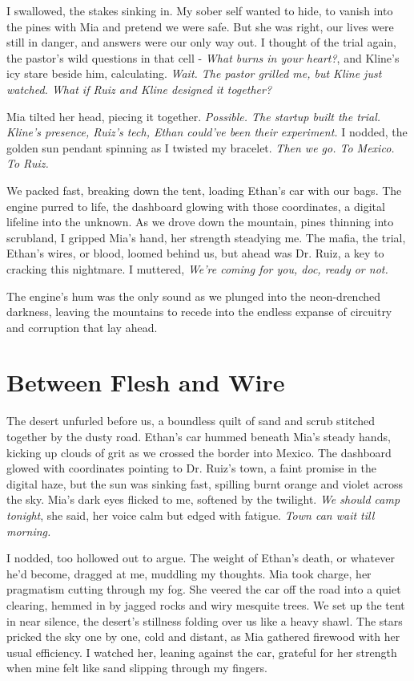 \documentclass[12pt,oneside]{book}
\begin{document}
I swallowed, the stakes sinking in. My sober self wanted to hide, to vanish into the pines with Mia and pretend we were safe. But she was right, our lives were still in danger, and answers were our only way out. I thought of the trial again, the pastor’s wild questions in that cell - \textit{What burns in your heart?}, and Kline’s icy stare beside him, calculating. \textit{Wait. The pastor grilled me, but Kline just watched. What if Ruiz and Kline designed it together?}

Mia tilted her head, piecing it together. \textit{Possible. The startup built the trial. Kline’s presence, Ruiz’s tech, Ethan could’ve been their experiment.} I nodded, the golden sun pendant spinning as I twisted my bracelet. \textit{Then we go. To Mexico. To Ruiz.}

We packed fast, breaking down the tent, loading Ethan’s car with our bags. The engine purred to life, the dashboard glowing with those coordinates, a digital lifeline into the unknown. As we drove down the mountain, pines thinning into scrubland, I gripped Mia’s hand, her strength steadying me. The mafia, the trial, Ethan’s wires, or blood, loomed behind us, but ahead was Dr. Ruiz, a key to cracking this nightmare. I muttered, \textit{We’re coming for you, doc, ready or not.}

The engine's hum was the only sound as we plunged into the neon-drenched darkness, leaving the mountains to recede into the endless expanse of circuitry and corruption that lay ahead.

\chapter{Between Flesh and Wire}

The desert unfurled before us, a boundless quilt of sand and scrub stitched together by the dusty road. Ethan's car hummed beneath Mia’s steady hands, kicking up clouds of grit as we crossed the border into Mexico. The dashboard glowed with coordinates pointing to Dr. Ruiz’s town, a faint promise in the digital haze, but the sun was sinking fast, spilling burnt orange and violet across the sky. Mia’s dark eyes flicked to me, softened by the twilight. \textit{We should camp tonight}, she said, her voice calm but edged with fatigue. \textit{Town can wait till morning.}

I nodded, too hollowed out to argue. The weight of Ethan’s death, or whatever he’d become, dragged at me, muddling my thoughts. Mia took charge, her pragmatism cutting through my fog. She veered the car off the road into a quiet clearing, hemmed in by jagged rocks and wiry mesquite trees. We set up the tent in near silence, the desert’s stillness folding over us like a heavy shawl. The stars pricked the sky one by one, cold and distant, as Mia gathered firewood with her usual efficiency. I watched her, leaning against the car, grateful for her strength when mine felt like sand slipping through my fingers.
\end{document}
